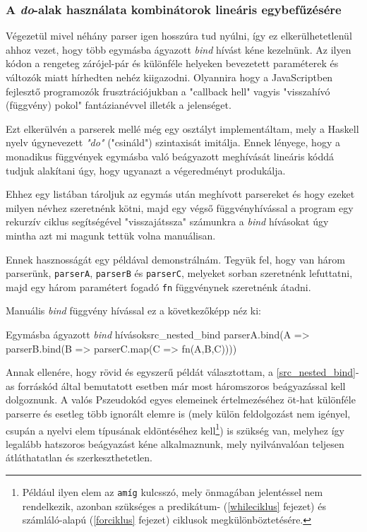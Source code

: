 \subsubsection{A \textit{do}-alak használata kombinátorok lineáris egybefűzésére}

Végezetül mivel néhány parser igen hosszúra tud nyúlni, így ez elkerülhetetlenül ahhoz vezet, hogy több egymásba ágyazott \textit{bind} hívást kéne kezelnünk. Az ilyen kódon a rengeteg zárójel-pár és különféle helyeken bevezetett paraméterek és változók miatt hírhedten nehéz kiigazodni. Olyannira hogy a JavaScriptben fejlesztő programozók frusztrációjukban a "callback hell" vagyis "visszahívó (függvény) pokol" fantázianévvel illeték a jelenséget.

Ezt elkerülvén a parserek mellé még egy osztályt implementáltam, mely a Haskell nyelv úgynevezett \textit{"do"} ("csináld") szintaxisát imitálja. Ennek lényege, hogy a monadikus függvények egymásba való beágyazott meghívását lineáris kóddá tudjuk alakítani úgy, hogy ugyanazt a végeredményt produkálja.

Ehhez egy listában tároljuk az egymás után meghívott parsereket és hogy ezeket milyen névhez szeretnénk kötni, majd egy végső függvényhívással a program egy rekurzív ciklus segítségével "visszajátssza" számunkra a \textit{bind} hívásokat úgy mintha azt mi magunk tettük volna manuálisan.

Ennek hasznosságát egy példával demonstrálnám. Tegyük fel, hogy van három parserünk, \texttt{parserA}, \texttt{parserB} és \texttt{parserC}, melyeket sorban szeretnénk lefuttatni, majd egy három paramétert fogadó \texttt{fn} függvénynek szeretnénk átadni.

Manuális \textit{bind} függvény hívással ez a következőképp néz ki:

\begin{code}{Egymásba ágyazott \textit{bind} hívások}{src_nested_bind}
parserA.bind(A => 
    parserB.bind(B => 
        parserC.map(C => 
            fn(A,B,C))))
\end{code}

Annak ellenére, hogy rövid és egyszerű példát választottam, a \ref{src_nested_bind}-as forráskód által bemutatott esetben már most háromszoros beágyazással kell dolgoznunk. A valós Pszeudokód egyes elemeinek értelmezéséhez öt-hat különféle parserre és esetleg több ignorált elemre is (mely külön feldolgozást nem igényel, csupán a nyelvi elem típusának eldöntéséhez kell\footnote{Például ilyen elem az \texttt{amíg} kulcsszó, mely önmagában jelentéssel nem rendelkezik, azonban szükséges a predikátum- (\ref{whileciklus} fejezet) és számláló-alapú (\ref{forciklus} fejezet) ciklusok megkülönböztetésére.}) is szükség van, melyhez így legalább hatszoros beágyazást kéne alkalmaznunk, mely nyilvánvalóan teljesen átláthatatlan és szerkeszthetetlen.

